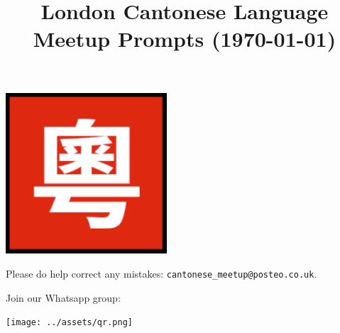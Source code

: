 \title{\vspace{-0.5cm} London Cantonese Language Meetup Prompts (\today{})}
\author{}
\date{}
\maketitle

\vspace{-2cm}

\begin{center}
  \includegraphics[width=0.45\textwidth]{../assets/logo.png}
\end{center}

Please do help correct any mistakes: \texttt{cantonese\_meetup@posteo.co.uk}.

Join our Whatsapp group:

\begin{center}
  \texttt{[image: ../assets/qr.png]}
\end{center}
